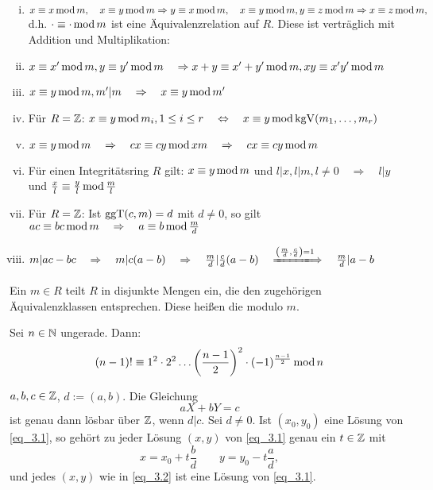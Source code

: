 \begin{falko} \label{F3.2}
	\begin{enumerate}[(i)]
		\item $x \equiv x \modu m, \quad x \equiv y \modu m \Rightarrow y \equiv x \modu m, \quad x \equiv y \modu m, y \equiv z \modu m \Rightarrow x \equiv z \modu m,$ \\
		d.h. $\cdot \equiv \cdot \modu m$ ist eine Äquivalenzrelation auf $R$. Diese ist verträglich mit Addition und Multiplikation:
		\item $x \equiv x' \modu m, y \equiv y' \modu m \quad \Rightarrow x+y \equiv x'+y' \modu m, xy \equiv x'y' \modu m$
		\item $x \equiv y \modu m, m'|m \quad \Rightarrow \quad x \equiv y \modu m'$
		\item Für $R = \ZZ$: \qquad $x \equiv y \modu m_i, 1 \leq i \leq r \quad \Leftrightarrow \quad x \equiv y \modu \kgV(m_1,\dots,m_r)$
		\item $x \equiv y \modu m \quad \Rightarrow \quad cx \kon cy \modu xm \quad \Rightarrow \quad cx \equiv cy \modu m$
		\item Für einen Integritätsring $R$ gilt: $x \equiv y \modu m$ und $l | x, l|m, l \neq 0 \quad \Rightarrow \quad l|y$ und $\frac{x}{l} \equiv \frac{y}{l} \modu \frac{m}{l}$
		\item Für $R = \ZZ$: Ist $\ggT(c,m) = d$ mit $d \neq 0$, so gilt $ac \kon bc \modu m \quad \Rightarrow \quad a \kon b \modu \frac{m}{d} $
		\item $m | ac-bc \quad \Rightarrow \quad m | c(a-b) \quad \Rightarrow \quad \frac{m}{d} | \frac{c}{d}(a-b) \quad \xLongrightarrow{\enbrace*{\frac{m}{d},\frac{c}{d}}=1} \quad \frac{m}{d} | a-b$
	\end{enumerate}
\end{falko}

\begin{defn}[Restklasse] \label{def_3.2}
	Ein $m \in R$ teilt $R$ in disjunkte Mengen ein, die den zugehörigen Äquivalenzklassen entsprechen. Diese heißen die  modulo $m$. 
\end{defn}

\begin{falko} \label{F3.3}
	Sei $n \in \NN$ ungerade. Dann:
	\[ (n-1)! \kon 1^2 \cdot 2^2 \dots \enbrace*{\frac{n-1}{2}}^2 \cdot (-1)^{\frac{n-1}{2}} \modu n \]
\end{falko}

\begin{falko} \label{F3.4}
	$a,b,c \in \ZZ$, $d:= (a,b)$. Die Gleichung
	\begin{equation}
		aX + bY = c \label{eq_3.1}
	\end{equation}
	ist genau dann lösbar über $\ZZ$, wenn $d | c$. Sei $d \neq 0$. Ist $(x_0,y_0)$ eine Lösung von \eqref{eq_3.1}, so gehört zu jeder Lösung $(x,y)$ von \eqref{eq_3.1} genau ein $t \in \ZZ$ mit
	\begin{equation}
		x = x_0 + t \frac{b}{d} \qquad y = y_0 - t \frac{a}{d}, \label{eq_3.2}
	\end{equation}
	und jedes $(x,y)$ wie in \eqref{eq_3.2} ist eine Lösung von \eqref{eq_3.1}.
\end{falko}

